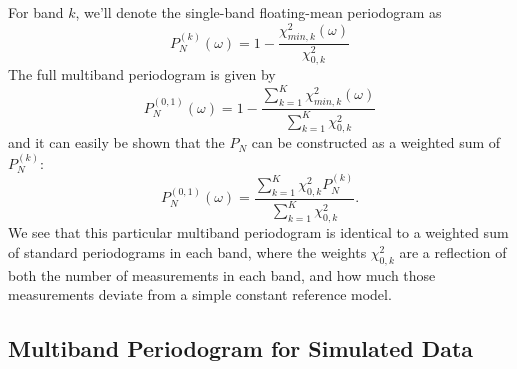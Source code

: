 \documentclass{emulateapj}
\newcommand{\sectlabel}[1]{\label{sect:#1}}
\begin{document}
For band $k$, we'll denote the single-band floating-mean periodogram as
\begin{equation}
  P_N^{(k)}(\omega) = 1 - \frac{\chi^2_{min, k}(\omega)}{\chi^2_{0,k}}
\end{equation}
The full multiband periodogram is given by
\begin{equation}
  P_N^{(0,1)}(\omega) = 1 - \frac{\sum_{k=1}^K\chi^2_{min, k}(\omega)}{\sum_{k=1}^K\chi^2_{0,k}}
\end{equation}
and it can easily be shown that the $P_N$ can be constructed as a weighted sum of $P_N^{(k)}$:
\begin{equation}
  P_N^{(0,1)}(\omega) = \frac{\sum_{k=1}^K\chi^2_{0,k}P_N^{(k)}}{\sum_{k=1}^K\chi^2_{0,k}}.
\end{equation}
We see that this particular multiband periodogram is identical to a weighted sum of standard periodograms in each band, where the weights $\chi^2_{0,k}$ are a reflection of both the number of measurements in each band, and how much those measurements deviate from a simple constant reference model.

\subsection{Multiband Periodogram for Simulated Data}
\sectlabel{Simulated}
\end{document}
